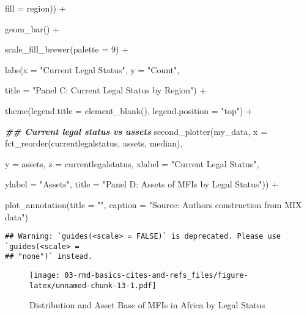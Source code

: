 \documentclass[a4paper,nobind]{templates/ociamthesis}
\newenvironment{Shaded}{\begin{snugshade}}{\end{snugshade}}
\newcommand{\AttributeTok}[1]{\textcolor[rgb]{0.77,0.63,0.00}{#1}}
\newcommand{\DecValTok}[1]{\textcolor[rgb]{0.00,0.00,0.81}{#1}}
\newcommand{\DocumentationTok}[1]{\textcolor[rgb]{0.56,0.35,0.01}{\textbf{\textit{#1}}}}
\newcommand{\FunctionTok}[1]{\textcolor[rgb]{0.00,0.00,0.00}{#1}}
\newcommand{\NormalTok}[1]{#1}
\newcommand{\SpecialCharTok}[1]{\textcolor[rgb]{0.00,0.00,0.00}{#1}}
\newcommand{\StringTok}[1]{\textcolor[rgb]{0.31,0.60,0.02}{#1}}
\renewenvironment{Shaded}
{
  \vspace{10pt}%
  \begin{snugshade}%
}{%
  \end{snugshade}%
  \vspace{8pt}%
}
\begin{document}
\begin{landscape}
\begin{Shaded}
\begin{Highlighting}[]
                     \AttributeTok{fill =}\NormalTok{ region)) }\SpecialCharTok{+} 
  
  \FunctionTok{geom\_bar}\NormalTok{() }\SpecialCharTok{+} 
  
  \FunctionTok{scale\_fill\_brewer}\NormalTok{(}\AttributeTok{palette =} \DecValTok{9}\NormalTok{) }\SpecialCharTok{+} 
  
  \FunctionTok{labs}\NormalTok{(}\AttributeTok{x =} \StringTok{"Current Legal Status"}\NormalTok{, }\AttributeTok{y =} \StringTok{"Count"}\NormalTok{, }
       
       \AttributeTok{title =} \StringTok{"Panel C: Current Legal Status by Region"}\NormalTok{) }\SpecialCharTok{+} 
  
  \FunctionTok{theme}\NormalTok{(}\AttributeTok{legend.title =} \FunctionTok{element\_blank}\NormalTok{(), }\AttributeTok{legend.position =} \StringTok{"top"}\NormalTok{) }\SpecialCharTok{+} 


\DocumentationTok{\#\# Current legal status vs assets}
\FunctionTok{second\_plotter}\NormalTok{(my\_data, }\AttributeTok{x =} \FunctionTok{fct\_reorder}\NormalTok{(currentlegalstatus, assets, median), }
           
          \AttributeTok{y =}\NormalTok{ assets, }\AttributeTok{z =}\NormalTok{ currentlegalstatus, }\AttributeTok{xlabel =} \StringTok{"Current Legal Status"}\NormalTok{, }
          
          \AttributeTok{ylabel =} \StringTok{"Assets"}\NormalTok{, }\AttributeTok{title =} \StringTok{"Panel D: Assets of MFIs by Legal Status"}\NormalTok{))  }\SpecialCharTok{+} 
  
  \FunctionTok{plot\_annotation}\NormalTok{(}\AttributeTok{title =} \StringTok{""}\NormalTok{, }\AttributeTok{caption =} \StringTok{"Source: Authors\textquotesingle{} construction from MIX data"}\NormalTok{)}
\end{Highlighting}
\end{Shaded}

\begin{verbatim}
## Warning: `guides(<scale> = FALSE)` is deprecated. Please use `guides(<scale> =
## "none")` instead.
\end{verbatim}

\begin{figure}
\centering
\texttt{[image: 03-rmd-basics-cites-and-refs\_files/figure-latex/unnamed-chunk-13-1.pdf]}
\caption{\label{fig:unnamed-chunk-13}Distribution and Asset Base of MFIs in Africa by Legal Status}
\end{figure}


\end{landscape}
\end{document}
